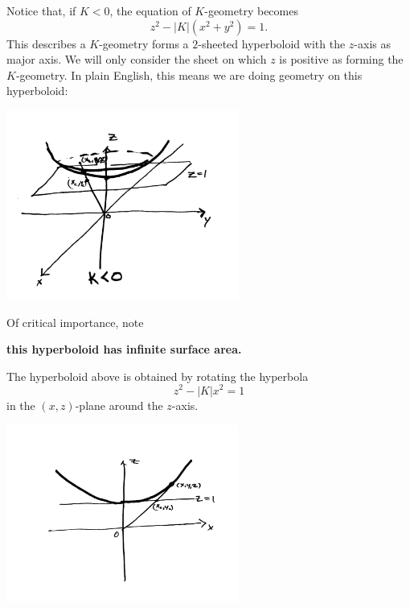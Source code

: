 \documentclass{ximera}
\begin{document}
Notice that, if $K<0$, the equation of $K$-geometry becomes
\[
z^{2}-|K|\left(x^{2}+y^{2}\right)  =1.
\]
This describes a $K$-geometry forms a $2$-sheeted hyperboloid with the
$z$-axis as major axis. We will only consider the sheet on which $z$
is positive as forming the $K$-geometry. In plain English, this means
we are doing geometry on this hyperboloid:
\begin{image}
\includegraphics[width=3in]{UpperHyperboloid.png}
\end{image}
Of critical importance, note

\begin{center}
  \textbf{this hyperboloid has infinite surface area.}
\end{center}

The hyperboloid above is obtained by rotating the hyperbola
\[
z^{2}-\left\vert K\right\vert x^{2}= 1
\]
in the $(x,z)$-plane around the $z$-axis.
\begin{image}
\includegraphics[width=3in]{UpperHyperbola.png}
\end{image}
\end{document}
